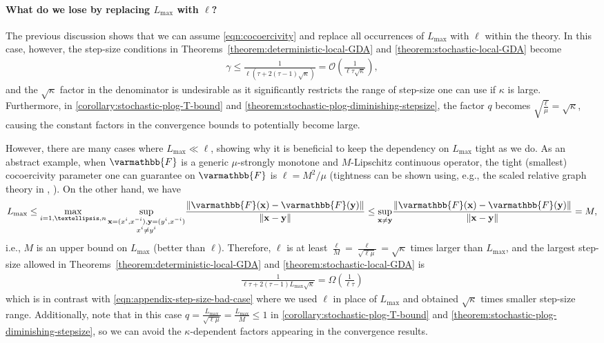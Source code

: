 \documentclass{article}
\newcommand{\vx}{{\mathbf{x}}}
\newcommand{\vy}{{\mathbf{y}}}
\newcommand{\cO}{{\mathcal{O}}}
\newcommand{\opF}{{\varmathbb{F}}}
\newcommand{\norm}[1]{\left\|#1\right\|}
\theoremstyle{plain}
\theoremstyle{remark}
\begin{document}
\paragraph{What do we lose by replacing $L_{\mathrm{max}}$ with $\ell$?}
The previous discussion shows that we can assume \eqref{eqn:cocoercivity} and replace all occurrences of $L_{\mathrm{max}}$ with $\ell$ within the theory.
In this case, however, the step-size conditions in Theorems~\ref{theorem:deterministic-local-GDA} and \ref{theorem:stochastic-local-GDA} become
\begin{align}
    \gamma \le \frac{1}{\ell (\tau + 2(\tau - 1)\sqrt{\kappa})} = \cO \left( \frac{1}{\ell\tau\sqrt{\kappa}} \right) ,
\label{eqn:appendix-step-size-bad-case}
\end{align}
and the $\sqrt{\kappa}$ factor in the denominator is undesirable as it significantly restricts the range of step-size one can use if $\kappa$ is large.
Furthermore, in \cref{corollary:stochastic-plog-T-bound} and \cref{theorem:stochastic-plog-diminishing-stepsize}, the factor $q$ becomes $\sqrt{\frac{\ell}{\mu}} = \sqrt{\kappa}$, causing the constant factors in the convergence bounds to potentially become large.

However, there are many cases where $L_{\mathrm{max}} \ll \ell$, showing why it is beneficial to keep the dependency on $L_{\mathrm{max}}$ tight as we do.
As an abstract example, when $\opF$ is a generic $\mu$-strongly monotone and $M$-Lipschitz continuous operator, the tight (smallest) cocoercivity parameter one can guarantee on $\opF$ is $\ell = M^2/\mu$ \citep{Facchinei2003FiniteDimensionalVI} (tightness can be shown using, e.g., the scaled relative graph theory in \citep{ryu2022scaled}, \citep[Chapter~13]{ryu2022large}).
On the other hand, we have
\[
    L_{\mathrm{max}} \le \underset{i=1,\dots,n}{\max} \, \underset{\substack{\vx = (x^i,x^{-i}), \vy = (y^i,x^{-i}) \\ x^i \ne y^i}}{\sup}  \frac{\norm{\opF(\vx)-\opF(\vy)}}{\norm{\vx-\vy}} \le \underset{\vx \ne \vy}{\sup} \frac{\norm{\opF(\vx)-\opF(\vy)}}{\norm{\vx-\vy}} = M ,
\]
i.e., $M$ is an upper bound on $L_{\mathrm{max}}$ (better than $\ell$).
Therefore, $\ell$ is at least $\frac{\ell}{M} = \frac{\ell}{\sqrt{\ell\mu}} = \sqrt{\kappa}$ times larger than $L_{\mathrm{max}}$, and the largest step-size allowed in Theorems~\ref{theorem:deterministic-local-GDA} and \ref{theorem:stochastic-local-GDA} is
\begin{align*}
    \frac{1}{\ell\tau + 2(\tau - 1) L_{\mathrm{max}} \sqrt{\kappa}} = \Omega \left( \frac{1}{\ell\tau} \right)
\end{align*}
which is in contrast with \eqref{eqn:appendix-step-size-bad-case} where we used $\ell$ in place of $L_{\mathrm{max}}$ and obtained $\sqrt{\kappa}$ times smaller step-size range.
Additionally, note that in this case $q = \frac{L_{\mathrm{max}}}{\sqrt{\ell\mu}} = \frac{L_{\mathrm{max}}}{M} \le 1$ in \cref{corollary:stochastic-plog-T-bound} and \cref{theorem:stochastic-plog-diminishing-stepsize}, so we can avoid the $\kappa$-dependent factors appearing in the convergence results.
\end{document}
